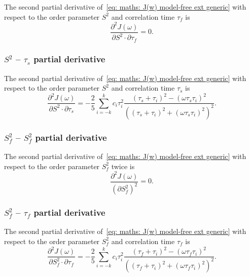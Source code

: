 The second partial derivative of~\eqref{eq: maths: J(w) model-free ext generic} with respect to the order parameter $S^2$ and correlation time $\tau_f$ is
\begin{equation}
    \frac{\partial^2 J(\omega)}{\partial S^2 \cdot \partial \tau_f} = 0.
\end{equation}


\subsubsection{$S^2$ -- $\tau_s$ partial derivative}

The second partial derivative of~\eqref{eq: maths: J(w) model-free ext generic} with respect to the order parameter $S^2$ and correlation time $\tau_s$ is
\begin{equation}
    \frac{\partial^2 J(\omega)}{\partial S^2 \cdot \partial \tau_s} = -\frac{2}{5} \sum_{i=-k}^k c_i \tau_i^2
        \frac{(\tau_s + \tau_i)^2 - (\omega \tau_s \tau_i)^2}{\left((\tau_s + \tau_i)^2 + (\omega \tau_s \tau_i)^2 \right)^2}.
\end{equation}



\subsubsection{$S^2_f$ -- $S^2_f$ partial derivative}

The second partial derivative of~\eqref{eq: maths: J(w) model-free ext generic} with respect to the order parameter $S^2_f$ twice is
\begin{equation}
    \frac{\partial^2 J(\omega)}{(\partial S^2_f)^2} = 0.
\end{equation}



\subsubsection{$S^2_f$ -- $\tau_f$ partial derivative}

The second partial derivative of~\eqref{eq: maths: J(w) model-free ext generic} with respect to the order parameter $S^2_f$ and correlation time $\tau_f$ is
\begin{equation}
    \frac{\partial^2 J(\omega)}{\partial S^2_f \cdot \partial \tau_f} = -\frac{2}{5} \sum_{i=-k}^k c_i \tau_i^2
        \frac{(\tau_f + \tau_i)^2 - (\omega \tau_f \tau_i)^2}{\left((\tau_f + \tau_i)^2 + (\omega \tau_f \tau_i)^2 \right)^2}.
\end{equation}



